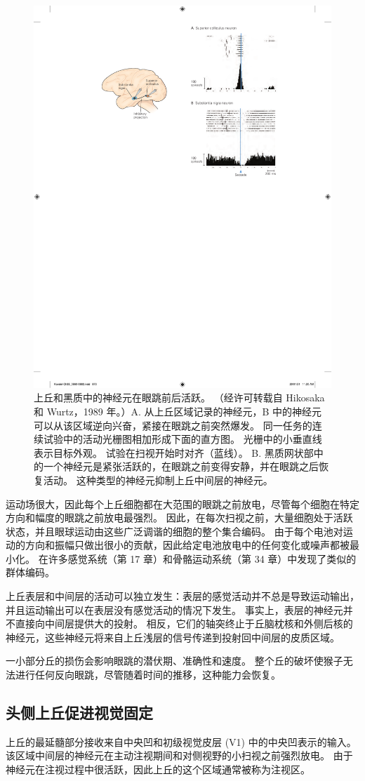 \begin{figure}[htbp]
	\centering
	\includegraphics[width=0.5\linewidth]{chap35/fig_35_11}
	\caption{上丘和黑质中的神经元在眼跳前后活跃。 （经许可转载自 Hikosaka 和 Wurtz，1989 年。）A. 从上丘区域记录的神经元，B 中的神经元可以从该区域逆向兴奋，紧接在眼跳之前突然爆发。 同一任务的连续试验中的活动光栅图相加形成下面的直方图。 光栅中的小垂直线表示目标外观。 试验在扫视开始时对齐（蓝线）。 B. 黑质网状部中的一个神经元是紧张活跃的，在眼跳之前变得安静，并在眼跳之后恢复活动。 这种类型的神经元抑制上丘中间层的神经元。}
	\label{fig:35_11}
\end{figure}

运动场很大，因此每个上丘细胞都在大范围的眼跳之前放电，尽管每个细胞在特定方向和幅度的眼跳之前放电最强烈。 因此，在每次扫视之前，大量细胞处于活跃状态，并且眼球运动由这些广泛调谐的细胞的整个集合编码。 由于每个电池对运动的方向和振幅只做出很小的贡献，因此给定电池放电中的任何变化或噪声都被最小化。 在许多感觉系统（第 17 章）和骨骼运动系统（第 34 章）中发现了类似的群体编码。

上丘表层和中间层的活动可以独立发生：表层的感觉活动并不总是导致运动输出，并且运动输出可以在表层没有感觉活动的情况下发生。 事实上，表层的神经元并不直接向中间层提供大的投射。 相反，它们的轴突终止于丘脑枕核和外侧后核的神经元，这些神经元将来自上丘浅层的信号传递到投射回中间层的皮质区域。

一小部分丘的损伤会影响眼跳的潜伏期、准确性和速度。 整个丘的破坏使猴子无法进行任何反向眼跳，尽管随着时间的推移，这种能力会恢复。

\subsection{头侧上丘促进视觉固定}
上丘的最延髓部分接收来自中央凹和初级视觉皮层 (V1) 中的中央凹表示的输入。 该区域中间层的神经元在主动注视期间和对侧视野的小扫视之前强烈放电。 由于神经元在注视过程中很活跃，因此上丘的这个区域通常被称为注视区。

